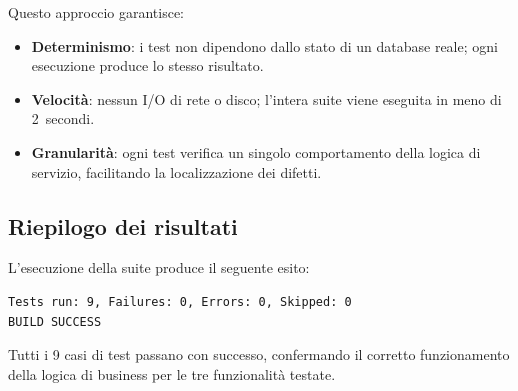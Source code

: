 Questo approccio garantisce:
\begin{itemize}
    \item \textbf{Determinismo}: i test non dipendono dallo stato di un database
    reale; ogni esecuzione produce lo stesso risultato.
    \item \textbf{Velocità}: nessun I/O di rete o disco; l'intera suite viene
    eseguita in meno di 2~secondi.
    \item \textbf{Granularità}: ogni test verifica un singolo comportamento
    della logica di servizio, facilitando la localizzazione dei difetti.
\end{itemize}

\subsection{Riepilogo dei risultati}

L'esecuzione della suite produce il seguente esito:

\begin{verbatim}
Tests run: 9, Failures: 0, Errors: 0, Skipped: 0
BUILD SUCCESS
\end{verbatim}

Tutti i 9 casi di test passano con successo, confermando il corretto
funzionamento della logica di business per le tre funzionalità testate.
